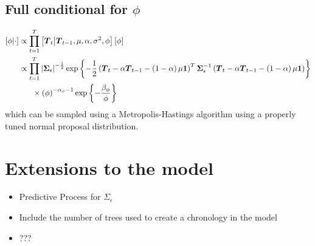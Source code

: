 \documentclass{article}\usepackage[]{graphicx}\usepackage[]{color}
\def\bm#1{\mbox{\boldmath $#1$}}
\begin{document}
\subsection{Full conditional for $\phi$}
%
\begin{align*}
%
\left[ \phi \middle| \cdot \right] & \propto \prod_{t = 1}^T \left[ \bm{T}_t \middle| \bm{T}_{t - 1}, \mu, \alpha, \sigma^2, \phi \right] \left[ \phi \right]\\
%
& \propto \prod_{t = 1}^T \left| \bm{\Sigma}_\epsilon \right|^{ - \frac{1} {2} } \exp{ \left\{ - \frac{1} {2} \left( \bm{T}_t  - \alpha \bm{T}_{t - 1} - \left( 1 - \alpha \right) \mu \bm{1} \right)^T \bm{\Sigma}_\epsilon^{ - 1} \left( \bm{T}_t  - \alpha \bm{T}_{t - 1} - \left( 1 - \alpha \right) \mu \bm{1} \right) \right\} }\\
& \hspace{6mm} \times \left( \phi \right)^{ - \alpha_\phi - 1} \exp{ \left\{ - \frac{\beta_\phi} {\phi} \right\} } \\
%
\end{align*}
%
which can be sampled using a Metropolis-Hastings algorithm using a properly tuned normal proposal distribution.\\
%
%
\section{Extensions to the model}
%
\begin{itemize}
%
\item Predictive Process for $\Sigma_\epsilon$
\item Include the number of trees used to create a chronology in the model
\item ???
%
\end{itemize}
% 
\end{document}
